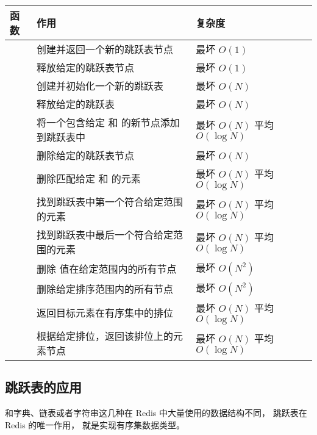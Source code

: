 \documentclass[a4paper,11pt,english]{sphinxmanual}
\begin{document}
\begin{tabulary}{\linewidth}{|p{4.3cm}|p{5.8cm}|L|}
\hline
\textbf{
函数
} & \textbf{
作用
} & \textbf{
复杂度
}\\\hline

 & 
创建并返回一个新的跳跃表节点
 & 
最坏 $O(1)$
\\\hline

 & 
释放给定的跳跃表节点
 & 
最坏 $O(1)$
\\\hline

 & 
创建并初始化一个新的跳跃表
 & 
最坏 $O(N)$
\\\hline

 & 
释放给定的跳跃表
 & 
最坏 $O(N)$
\\\hline

 & 
将一个包含给定  和  的新节点添加到跳跃表中
 & 
最坏 $O(N)$ 平均 $O(\log N)$
\\\hline

 & 
删除给定的跳跃表节点
 & 
最坏 $O(N)$
\\\hline

 & 
删除匹配给定  和  的元素
 & 
最坏 $O(N)$ 平均 $O(\log N)$
\\\hline

 & 
找到跳跃表中第一个符合给定范围的元素
 & 
最坏 $O(N)$ 平均 $O(\log N)$
\\\hline

 & 
找到跳跃表中最后一个符合给定范围的元素
 & 
最坏 $O(N)$ 平均 $O(\log N)$
\\\hline

 & 
删除  值在给定范围内的所有节点
 & 
最坏 $O(N^2)$
\\\hline

 & 
删除给定排序范围内的所有节点
 & 
最坏 $O(N^2)$
\\\hline

 & 
返回目标元素在有序集中的排位
 & 
最坏 $O(N)$ 平均 $O(\log N)$
\\\hline

 & 
根据给定排位，返回该排位上的元素节点
 & 
最坏 $O(N)$ 平均 $O(\log N)$
\\\hline
\end{tabulary}



\subsection{跳跃表的应用}
\label{internal-datastruct/skiplist:id4}
和字典、链表或者字符串这几种在 Redis 中大量使用的数据结构不同，
跳跃表在 Redis 的唯一作用，
就是实现有序集数据类型。
\end{document}
